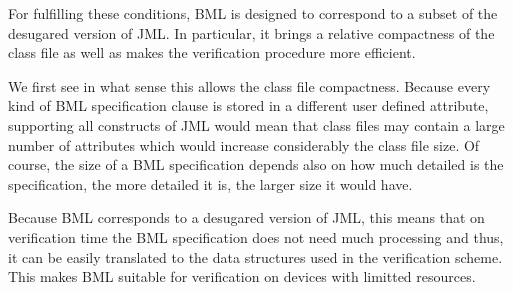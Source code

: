 


      For fulfilling these conditions, BML is designed to correspond
      to a subset of the desugared version of JML.  In particular, it
      brings a relative compactness of the class file as well as makes
      the verification procedure more efficient.


      We first see in what sense this allows the class file
      compactness. Because every kind of BML specification clause is
      stored in a different user defined attribute, supporting all
      constructs of JML would mean that class files may contain a
      large number of attributes which would increase considerably the
      class file size. Of course, the size of a BML specification
      depends also on how much detailed is the specification, the more
      detailed it is, the larger size it would have.
      

      Because BML corresponds to a desugared version of JML, this
      means that on verification time the BML specification does not
      need much processing and thus, it can be easily translated to
      the data structures used in the verification scheme. This makes
      BML suitable for verification on devices with limitted
      resources.
      


